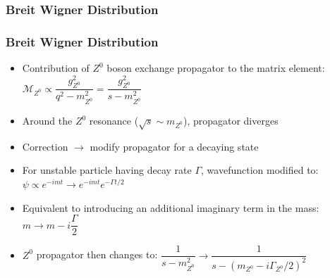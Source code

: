 \documentclass[10pt]{beamer}
\begin{document}
\subsubsection{Breit Wigner Distribution}
\begin{frame}
\frametitle{Breit Wigner Distribution}
\begin{itemize}
\item Contribution of $Z^{0}$ boson exchange propagator to the matrix element:
\vspace{0.5em}
$\mathcal{M}_{Z^{0}}\propto \dfrac{g_{Z^{0}}^{2}}{q^{2}-m_{Z^{0}}^{2}}=\dfrac{g_{Z^{0}}^{2}}{s-m_{Z^{0}}^{2}}$
\item Around the $Z^{0}$ resonance ($\sqrt{s}\sim  m_{Z^{0}}$), propagator diverges
\item Correction $\rightarrow$ modify propagator for a decaying state
\item For unstable particle having decay rate $\Gamma$, wavefunction modified to:
\vspace{0.5em}
$\psi\propto e^{-imt}\rightarrow e^{-imt}e^{-\Gamma t/2}$
\item Equivalent to introducing an additional imaginary term in the mass:
\vspace{0.5em}
$m\rightarrow m-i\dfrac{\Gamma}{2}$
\item $Z^{0}$ propagator then changes to:
\vspace{0.5em}
$\dfrac{1}{s-m_{Z^{0}}^{2}}\rightarrow \dfrac{1}{s-{\left(m_{Z^{0}}-i\Gamma_{Z^{0}}/2\right)}^{2}}$
\end{itemize}
\end{frame}
\end{document}
